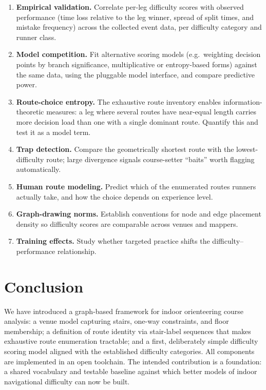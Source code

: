 \documentclass[11pt,a4paper,twocolumn]{article}
\begin{document}
\begin{enumerate}
    \item \textbf{Empirical validation.} Correlate per-leg difficulty scores
          with observed performance (time loss relative to the leg winner,
          spread of split times, and mistake frequency) across the
          collected event data, per difficulty category and runner class.
    \item \textbf{Model competition.} Fit alternative scoring models (e.g.\
          weighting decision points by branch significance, multiplicative or
          entropy-based forms) against the same data, using the pluggable
          model interface, and compare predictive power.
    \item \textbf{Route-choice entropy.} The exhaustive route inventory
          enables information-theoretic measures: a leg where several routes
          have near-equal length carries more decision load than one with a
          single dominant route. Quantify this and test it as a model term.
    \item \textbf{Trap detection.} Compare the geometrically shortest route
          with the lowest-difficulty route; large divergence signals
          course-setter ``baits'' worth flagging automatically.
    \item \textbf{Human route modeling.} Predict which of the enumerated
          routes runners actually take, and how the choice depends on experience level.
    \item \textbf{Graph-drawing norms.} Establish conventions for node and
          edge placement density so difficulty scores are comparable across
          venues and mappers.
    \item \textbf{Training effects.} Study whether targeted practice 
          shifts the difficulty--performance relationship.
\end{enumerate}

\section{Conclusion}

We have introduced a graph-based framework for indoor orienteering course
analysis: a venue model capturing stairs, one-way constraints, and floor
membership; a definition of route identity via stair-label sequences that
makes exhaustive route enumeration tractable; and a first, deliberately
simple difficulty scoring model aligned with the established difficulty
categories. All components are implemented in an open toolchain. 
The intended contribution is a foundation:
a shared vocabulary and testable baseline against which better models of
indoor navigational difficulty can now be built.
\end{document}
